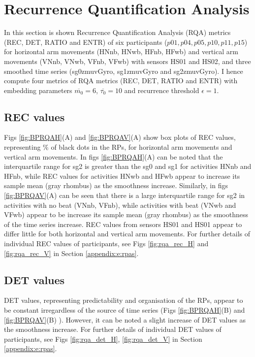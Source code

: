 \newpage
\section{Recurrence Quantification Analysis} \label{ch5:rqas}
In this section is shown Recurrence Quantification Analysis (RQA) metrics 
(REC, DET, RATIO and ENTR) of six participants ($p01, p04, p05, p10, p11, p15$)
for horizontal arm movements (HNnb, HNwb, HFnb, HFwb) 
and vertical arm movements (VNnb, VNwb, VFnb, VFwb)  
with sensors HS01 and HS02, and three smoothed time series 
(sg0zmuvGyro, sg1zmuvGyro and  sg2zmuvGyro).
I hence compute four metrics of RQA metrics (REC, DET, RATIO and ENTR) with 
embedding parameters $\overline{m_0}=6$, $\overline{\tau_0}=10$ and 
recurrence threshold $\epsilon=1$.
 
\subsection*{REC values}
Figs \ref{fig:BPRQAH}(A) and \ref{fig:BPRQAV}(A) 
show box plots of REC values, representing \% of black 
dots in the RPs, for horizontal arm movements and 
vertical arm movements. 
In figs \ref{fig:BPRQAH}(A) can be noted that the interquartile range for sg2 
is greater than the sg0 and sg1 for activities HNnb and HFnb, while
REC values for activities HNwb and HFwb appear to increase 
its sample mean (gray rhombus) as the smoothness increase.
Similarly, in figs \ref{fig:BPRQAV}(A) can be seen that there is a large 
interquartile range for sg2 in activities with no beat (VNnb, VFnb), while
activities with beat (VNwb and VFwb) appear to be increase its sample
mean (gray rhombus) as the smoothness of the time series increase. 
REC values from sensors HS01 and HS01 appear to differ little 
for both horizontal and vertical arm movements. 
For further details of individual REC values of participants, see 
Figs \ref{fig:rqa_rec_H} and \ref{fig:rqa_rec_V} in 
Section \ref{appendix:e:rpas}.

\subsection*{DET values}
DET values, representing predictability and organisation of the RPs, appear
to be constant irregardless of the source of time series 
(Figs \ref{fig:BPRQAH}(B) and \ref{fig:BPRQAV}(B) ).
However, it can be noted a slight increase of DET values as the 
smoothness increase.
For further details of individual DET values of participants, see 
Figs \ref{fig:rqa_det_H}, \ref{fig:rqa_det_V} in
Section \ref{appendix:e:rpas}.

